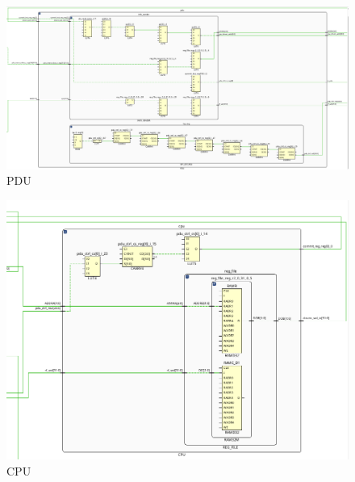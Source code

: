 \documentclass[12pt,a4paper]{ctexart}
\begin{document}
\begin{figure}[H]
    \centering
    \includegraphics[scale=0.3]{pic/12.png}
    \caption{PDU}
\end{figure}
\begin{figure}[H]
    \centering
    \includegraphics[scale=0.5]{pic/13.png}
    \caption{CPU}
\end{figure}
\end{document}
